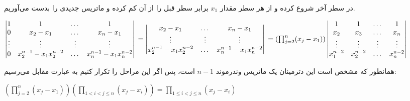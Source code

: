 در سطر آخر شروع کرده و ‌از هر سطر مقدار 
$x_1$
برابر سطر قبل را از آن کم کرده و ماتریس جدیدی را بدست می‌آوریم.

\setLTR
$
\begin{vmatrix}
	1 & 1 & \dots & 1 \\
	0& x_2 - x_1 & \dots & x_n - x_1 \\
	\vdots & \vdots & \vdots & \vdots \\
	0 & x_2^{n-1} - x_1x_2^{n-2} & \dots & x_n^{n-1}-x_1x_n^{n-2}
\end{vmatrix} \\
 = \begin{vmatrix}
x_2 - x_1 & \dots & x_n - x_1 \\
\vdots & \vdots & \vdots \\
x_2^{n-1}-x_1x_2^{n-2} & \dots & x_n^{n-1}-x_1x_n^{n-2}
\end{vmatrix} \\ \\ \\= 
(\prod_{j=2}^{n}(x_j-x_1)) \begin{vmatrix}
	1 & 1 & \dots & 1 \\
	x_2 & x_3 & \dots & x_n \\
	\vdots & \vdots & \vdots & \vdots \\
	x_1^{n-2} & x_2^{n-2} & \dots & x_n^{n-2}
\end{vmatrix}
$
\setRTL

همانطور که مشخص است این دترمینان یک ماتریس وندرموند 
$n-1$
است، پس اگر این مراحل را تکرار کنیم به عبارت مقابل می‌رسیم:

\setLTR
$
(\prod_{j=2}^{n}(x_j-x_1))(\prod_{1< i < j \leq n}(x_j-x_i)) = \prod_{1\leq i < j \leq n} (x_j - x_i)
$
\setRTL